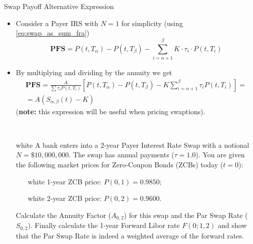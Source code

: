 \documentclass{beamer}
\begin{document}
\begin{frame}{Swap Payoff Alternative Expression}
	\begin{itemize}
		\item<1-> Consider a Payer IRS with $N=1$ for simplicity (using \cref{eq:swap_as_sum_fra})
		\begin{equation*}
			\textbf{PFS} = P(t,T_\alpha)-P(t,T_\beta)-\sum_{i=\alpha+1}^{\beta}K\cdot\tau_i\cdot P(t,T_i)
		\end{equation*}
		\item<2-> By multiplying and dividing by the \textcolor{maincolor}{annuity}
		we get
		\begin{equation}
			\begin{gathered}
				\textbf{PFS}=\frac{A}{\sum\tau_iP(t, T_i)}\left[P(t,T_\alpha)-P(t,T_\beta)-K\sum_{i=\alpha+1}^{\beta}\tau_i P(t,T_i)\right]=\\
				= \boxed{A (S_{\alpha,\beta}(t)-K)}
			\end{gathered}
			\label{eq:swap_payoff_with_swap_rate}
		\end{equation}
		(\textbf{note:} this expression will be useful when pricing swaptions).
	\end{itemize}
\end{frame}

\begin{homework}
	\begin{frame}{\textcolor{white}{Homework}}
		\begin{itemize}
			\item[white] A bank enters into a 2-year Payer Interest Rate Swap with a notional $N=\$10,000,000$. The swap has annual payments ($\tau =1.0$). You are given the following market prices for Zero-Coupon Bonds (ZCBs) today ($t=0$):
			\begin{itemize}
				\item[white] 1-year ZCB price: $P(0,1)=0.9850$;
				\item[white] 2-year ZCB price: $P(0,2)=0.9600$.
			\end{itemize}
			Calculate the Annuity Factor ($A_{0,2}$) for this swap and the Par Swap Rate ($S_{0,2}$).
			Finally	calculate the 1-year Forward Libor rate $F(0;1,2)$ and show that the Par Swap Rate is indeed a weighted average of the forward rates.
		\end{itemize}
	\end{frame}
\end{homework}
\end{document}
